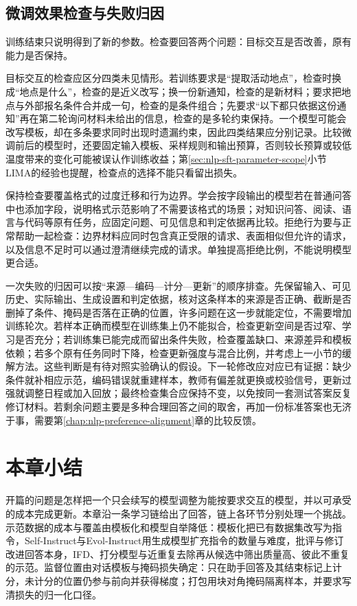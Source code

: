 \subsection{微调效果检查与失败归因}
\label{sec:nlp-sft-checking}

训练结束只说明得到了新的参数。检查要回答两个问题：目标交互是否改善，原有能力是否保持。

目标交互的检查应区分四类未见情形。若训练要求是“提取活动地点”，检查时换成“地点是什么”，检查的是近义改写；换一份新通知，检查的是新材料；要求把地点与外部报名条件合并成一句，检查的是条件组合；先要求“以下都只依据这份通知”再在第二轮询问材料未给出的信息，检查的是多轮约束保持。一个模型可能会改写模板，却在多条要求同时出现时遗漏约束，因此四类结果应分别记录。比较微调前后的模型时，还要固定输入模板、采样规则和输出预算，否则较长预算或较低温度带来的变化可能被误认作训练收益；第\ref{sec:nlp-sft-parameter-scope}小节LIMA的经验也提醒，检查点的选择不能只看留出损失。

保持检查要覆盖格式的过度迁移和行为边界。学会按字段输出的模型若在普通问答中也添加字段，说明格式示范影响了不需要该格式的场景；对知识问答、阅读、语言与代码等原有任务，应固定问题、可见信息和判定依据再比较。拒绝行为要与正常帮助一起检查：边界材料应同时包含真正受限的请求、表面相似但允许的请求，以及信息不足时可以通过澄清继续完成的请求。单独提高拒绝比例，不能说明模型更合适。

一次失败的归因可以按“来源—编码—计分—更新”的顺序排查。先保留输入、可见历史、实际输出、生成设置和判定依据，核对这条样本的来源是否正确、截断是否删掉了条件、掩码是否落在正确的位置，许多问题在这一步就能定位，不需要增加训练轮次。若样本正确而模型在训练集上仍不能拟合，检查更新空间是否过窄、学习是否充分；若训练集已能完成而留出条件失败，检查覆盖缺口、来源差异和模板依赖；若多个原有任务同时下降，检查更新强度与混合比例，并考虑上一小节的缓解方法。这些判断是有待对照实验确认的假设。下一轮修改应对应已有证据：缺少条件就补相应示范，编码错误就重建样本，教师有偏差就更换或校验信号，更新过强就调整日程或加入回放；最终检查集合应保持不变，以免按同一套测试答案反复修订材料。若剩余问题主要是多种合理回答之间的取舍，再加一份标准答案也无济于事，需要第\ref{chap:nlp-preference-alignment}章的比较反馈。

\section{本章小结}
\label{sec:nlp-sft-summary}

开篇的问题是怎样把一个只会续写的模型调整为能按要求交互的模型，并以可承受的成本完成更新。本章沿一条学习链给出了回答，链上各环节分别处理一个挑战。示范数据的成本与覆盖由模板化和模型自举降低：模板化把已有数据集改写为指令，Self-Instruct与Evol-Instruct用生成模型扩充指令的数量与难度，批评与修订改进回答本身，IFD、打分模型与近重复去除再从候选中筛出质量高、彼此不重复的示范。监督位置由对话模板与掩码损失确定：只在助手回答及其结束标记上计分，未计分的位置仍参与前向并获得梯度；打包用块对角掩码隔离样本，并要求写清损失的归一化口径。

